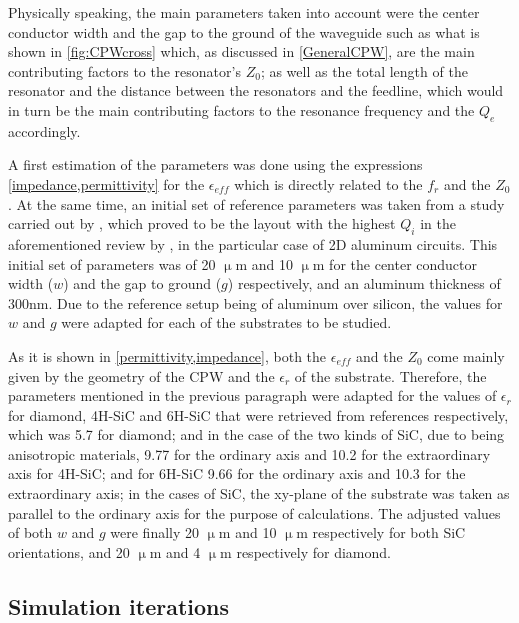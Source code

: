 \documentclass[12pt, a4paper]{article}
\begin{document}
Physically speaking, the main parameters taken into account were the center conductor width and the gap to the ground of the waveguide such as what is shown in \cref{fig:CPWcross} which, as discussed in \cref{GeneralCPW}, are the main contributing factors to the resonator's $Z_0$; as well as the total length of the resonator and the distance between the resonators and the feedline, which would in turn be the main contributing factors to the resonance frequency and the $Q_e$ accordingly.

A first estimation of the parameters was done using the expressions \cref{impedance,permittivity} for the $\epsilon_{eff}$ which is directly related to the $f_r$ and the $Z_0$. At the same time, an initial set of reference parameters was taken from a study carried out by \cite{Biznarova2024}, which proved to be the layout with the highest $Q_i$ in the aforementioned review by \cite{Ghione1987}, in the particular case of 2D aluminum circuits. This initial set of parameters was of 20 $\upmu$m and 10 $\upmu$m for the center conductor width ($w$) and the gap to ground ($g$) respectively, and an aluminum thickness of 300nm. Due to the reference setup being of aluminum over silicon, the values for $w$ and $g$ were adapted for each of the substrates to be studied.

As it is shown in \cref{permittivity,impedance}, both the $\epsilon_{eff}$ and the $Z_0$ come mainly given by the geometry of the CPW and the $\epsilon_r$ of the substrate. Therefore, the parameters mentioned in the previous paragraph were adapted for the values of $\epsilon_r$ for diamond, 4H-SiC and 6H-SiC that were retrieved from references \cite{Griesmayer, Li2024, Patrick1970} respectively, which was 5.7 for diamond; and in the case of the two kinds of SiC, due to being anisotropic materials, 9.77 for the ordinary axis and 10.2 for the extraordinary axis for 4H-SiC; and for 6H-SiC 9.66 for the ordinary axis and 10.3 for the extraordinary axis; in the cases of SiC, the xy-plane of the substrate was taken as parallel to the ordinary axis for the purpose of calculations. The adjusted values of both $w$ and $g$ were finally 20 $\upmu$m and 10 $\upmu$m respectively for both SiC orientations, and 20 $\upmu$m and 4 $\upmu$m respectively for diamond.

\subsection{Simulation iterations} \label{SimIterations}
\end{document}
